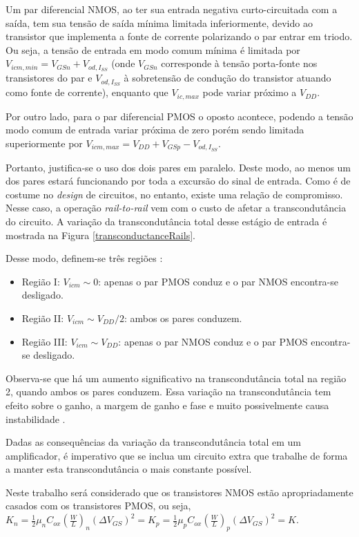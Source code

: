 \documentclass[
	12pt,				%
	oneside,			%
	a4paper,			%
	english,			%
	french,				%
	spanish,			%
	brazil				%
	]{abntex2}
\begin{document}
Um par diferencial NMOS, ao ter sua entrada negativa curto-circuitada com a saída, tem sua tensão de saída mínima limitada inferiormente, devido ao transistor que implementa a fonte de corrente polarizando o par entrar em triodo. Ou seja, a tensão de entrada em modo comum mínima é limitada por \(V_{icm,min} = V_{GSn} + V_{od,I_{SS}}\) (onde \(V_{GSn}\) corresponde à tensão porta-fonte nos transistores do par e \(V_{od,I_{SS}}\) à sobretensão de condução do transistor atuando como fonte de corrente), enquanto que \(V_{ic,max}\) pode variar próximo a $V_{DD}$. 

Por outro lado, para o par diferencial PMOS o oposto acontece, podendo a tensão modo comum de entrada variar próxima de zero porém sendo limitada superiormente por \(V_{icm,max} = V_{DD} + V_{GSp} - V_{od,I_{SS}}\).

Portanto, justifica-se o uso dos dois pares em paralelo. Deste modo, ao menos um dos pares estará funcionando por toda a excursão do sinal de entrada. Como é de costume no \textit{design} de circuitos, no entanto, existe uma relação de compromisso. Nesse caso, a operação \textit{rail-to-rail} vem com o custo de afetar a transcondutância do circuito. A variação da transcondutância total desse estágio de entrada é mostrada na Figura \ref{transconductanceRails}.

Desse modo, definem-se três regiões \cite{Leandro}:
\begin{itemize}
    \item Região I: $V_{icm} \sim  0$: apenas o par PMOS conduz e o par NMOS encontra-se
desligado.
    \item Região II: $V_{icm} \sim V_{DD}/2$: ambos os pares conduzem.
    \item Região III: $V_{icm} \sim V_{DD}$: apenas o par NMOS conduz e o par PMOS encontra-se desligado.
\end{itemize}

Observa-se que há um aumento significativo na transcondutância total na região 2,
quando ambos os pares conduzem. Essa variação na transcondutância tem efeito sobre o
ganho, a margem de ganho e fase e muito possivelmente causa instabilidade \cite{dehghani2013design}.

Dadas as consequências da variação da transcondutância total em um amplificador, é imperativo que se inclua um circuito extra que trabalhe de forma a manter esta transcondutância o mais constante possível.

Neste trabalho será considerado que os transistores NMOS estão apropriadamente
casados com os transistores PMOS, ou seja, \(K_n = \frac{1}{2}\mu_{n}C_{ox}(\frac{W}{L})_n(\Delta V_{GS})^2 = K_p = \frac{1}{2}\mu_{p}C_{ox}(\frac{W}{L})_p(\Delta V_{GS})^2 = K\).
\end{document}
